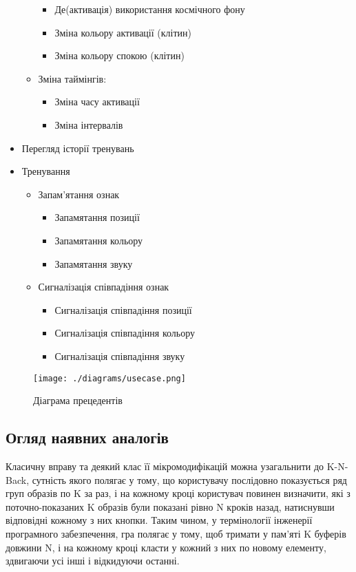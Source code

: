 \begin{itemize}
\begin{itemize}
\begin{itemize}
          \item Де(активація) використання космічного фону
          \item Зміна кольору активації (клітин)
          \item Зміна кольору спокою (клітин)
        \end{itemize}
      \item Зміна таймінгів:
        \begin{itemize}
          \item Зміна часу активації
          \item Зміна інтервалів
        \end{itemize}
    \end{itemize}
  \item Перегляд історії тренувань
  \item Тренування
    \begin{itemize}
      \item Запам'ятання ознак
        \begin{itemize}
          \item Запамятання позиції
          \item Запамятання кольору
          \item Запамятання звуку
        \end{itemize}
      \item Сигналізація співпадіння ознак
        \begin{itemize}
          \item Сигналізація співпадіння позиції
          \item Сигналізація співпадіння кольору
          \item Сигналізація співпадіння звуку
        \end{itemize}
    \end{itemize}
\end{itemize}

\begin{figure}[here]
  \caption{Діаграма прецедентів}
  \centering\texttt{[image: ./diagrams/usecase.png]}
  \label{fig:usecase}
\end{figure}

\subsection{Огляд наявних аналогів}

Класичну вправу та деякий клас її мікромодифікацій можна узагальнити до K-N-Back, сутність якого полягає у тому, що користувачу послідовно показується ряд груп образів по K за раз, і на кожному кроці користувач повинен визначити, які з поточно-показаних K образів були показані рівно N кроків назад, натиснувши відповідні кожному з них кнопки. Таким чином, у термінології інженерії програмного забезпечення, гра полягає у тому, щоб тримати у пам'яті K буферів довжини N, і на кожному кроці класти у кожний з них по новому елементу, здвигаючи усі інші і відкидуючи останні.

